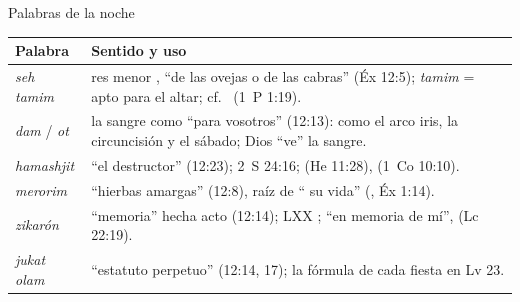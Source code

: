 \begin{frame}{Palabras de la noche}
\scriptsize\renewcommand{\arraystretch}{1.16}
\begin{tabular}{@{}L{2.9cm}L{9.2cm}@{}}
\toprule
\textbf{Palabra} & \textbf{Sentido y uso} \\ \midrule
{} \emph{seh tamim} & res menor , ``de las ovejas o de las cabras'' (Éx 12:5); \emph{tamim} = apto para el altar; cf.\  (1~P 1:19). \\
 \emph{dam} /  \emph{ot} & la sangre como  ``para vosotros'' (12:13): como el arco iris, la circuncisión y el sábado; Dios ``ve'' la sangre. \\
 \emph{hamashjit} & ``el destructor'' (12:23); 2~S 24:16;  (He 11:28),  (1~Co 10:10). \\
 \emph{merorim} & ``hierbas amargas'' (12:8), raíz de `` su vida'' (, Éx 1:14). \\
 \emph{zikarón} & ``memoria'' hecha acto (12:14); LXX ; ``en memoria de mí'',  (Lc 22:19). \\
 \emph{jukat olam} & ``estatuto perpetuo'' (12:14, 17); la fórmula de cada fiesta en Lv 23. \\
\bottomrule
\end{tabular}\par\smallskip
{}
\end{frame}

